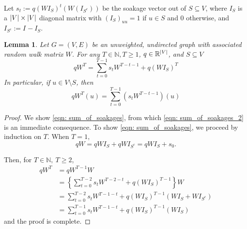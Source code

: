 \documentclass[11pt,twoside]{article}
\newtheorem{lemma}{Lemma}
\DeclarePairedDelimiter\abs{\lvert}{\rvert}
\newcommand{\Reals}{\mathbb{R}}
\newcommand{\1}{\mathbf{1}}
\newcommand{\Wbf}{W}
\newcommand{\Ibf}[1]{I_{#1}}
\begin{document}
Let $s_t := q(\Wbf \Ibf{S})^t(\Wbf(\Ibf{S^c}))$ be the soakage vector out of $S \subseteq V$, where $\Ibf{S}$ is a $\abs{V} \times \abs{V}$ diagonal matrix with $(\Ibf{S})_{uu} = 1$ if $u \in S$ and 0 otherwise, and $\Ibf{S^c} := \Ibf{} - \Ibf{S}$. 
\begin{lemma}
	\label{lem: sum_of_soakages}
	Let $G = (V,E)$ be an unweighted, undirected graph with associated random walk matrix $\Wbf$. For any $T \in \mathbb{N}, T \geq 1$, $q \in \Reals^{\abs{V}}$, and $S \subseteq V$
	\begin{equation}
	\label{eqn: sum_of_soakages}
	q\Wbf^T = \sum_{t = 0}^{T - 1} s_t \Wbf^{T - t - 1} + q(\Wbf \Ibf{S})^T
	\end{equation}
	In particular, if $u \in V\setminus S$, then
	\begin{equation}
	\label{eqn: sum_of_soakages_2}
	q\Wbf^T(u) = \sum_{t = 0}^{T - 1} \left(s_t \Wbf^{T - t - 1}\right)(u)
	\end{equation}
\end{lemma}
\begin{proof}	
	We show \eqref{eqn: sum_of_soakages}, from which \eqref{eqn: sum_of_soakages_2} is an immediate consequence.
	To show \eqref{eqn: sum_of_soakages}, we proceed by induction on $T$. When $T = 1$,
	\begin{equation*}
	q\Wbf = q\Wbf\Ibf{S} + q\Wbf\Ibf{S^c} =  q\Wbf\Ibf{S} + s_0. 
	\end{equation*}
	
	Then, for $T \in \mathbb{N},~ T \geq 2$,
	\begin{align*}
	q\Wbf^{T} & = q\Wbf^{T - 1}{\Wbf} \\
	& = \left\{\sum_{t = 0}^{T - 2} s_t \Wbf^{T - 2 - t} + q(\Wbf \Ibf{S})^{T - 1} \right\} \Wbf \tag{by the inductive hypothesis}\\
	& = \sum_{t = 0}^{T - 2} s_t \Wbf^{T - 1 - t} + q(\Wbf \Ibf{S})^{T - 1} (\Wbf \Ibf{S} + \Wbf \Ibf{S^c}) \\
	& = \sum_{t = 0}^{T - 1} s_t \Wbf^{T - 1 - t} + q(\Wbf \Ibf{S})^{T - 1} (\Wbf \Ibf{S})
	\end{align*}
	and the proof is complete.
\end{proof}
\end{document}

